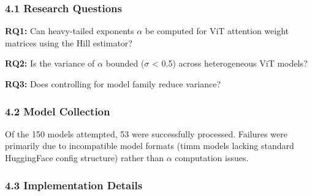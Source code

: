 
\subsubsection{4.1 Research Questions}

\textbf{RQ1:} Can heavy-tailed exponents $\alpha$ be computed for ViT attention weight matrices using the Hill estimator?

\textbf{RQ2:} Is the variance of $\alpha$ bounded ($\sigma$ < 0.5) across heterogeneous ViT models?

\textbf{RQ3:} Does controlling for model family reduce variance?

\subsubsection{4.2 Model Collection}

\begin{table}[htbp]
\centering
{}
\end{table}

Of the 150 models attempted, 53 were successfully processed. Failures were primarily due to incompatible model formats (timm models lacking standard HuggingFace config structure) rather than $\alpha$ computation issues.

\subsubsection{4.3 Implementation Details}

\begin{table}[htbp]
\centering
{}
\end{table}

